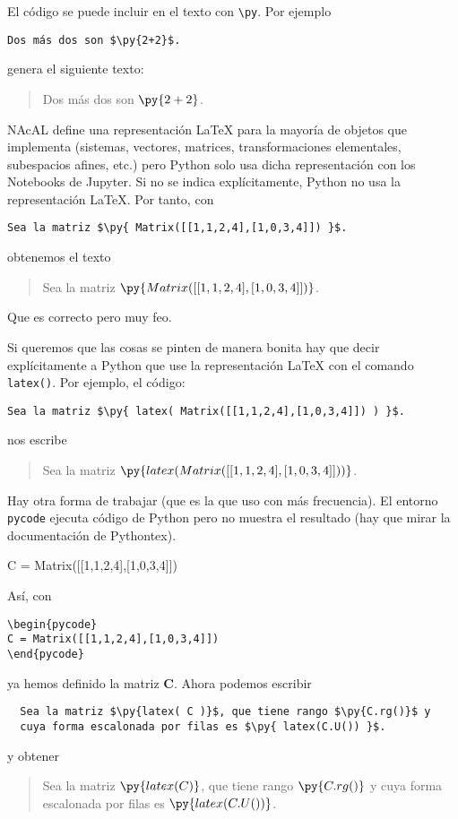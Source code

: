\documentclass[12pt,a4paper]{article} %
\begin{document}
El código se puede incluir en el texto con \verb+\py+. Por ejemplo
\begin{Verbatim}
Dos más dos son $\py{2+2}$.
\end{Verbatim}
genera el siguiente texto:
\begin{quote}
  Dos más dos son $\py{2+2}$.
\end{quote}

NAcAL define una representación \LaTeX{} para la mayoría de objetos
que implementa (sistemas, vectores, matrices, transformaciones
elementales, subespacios afines, etc.) pero Python solo usa dicha
representación con los Notebooks de Jupyter. Si no se indica
explícitamente, Python no usa la representación \LaTeX{}. Por tanto,
con
\begin{Verbatim}
Sea la matriz $\py{ Matrix([[1,1,2,4],[1,0,3,4]]) }$.
\end{Verbatim}
obtenemos el texto
\begin{quote}
  Sea la matriz $\py{ Matrix([[1,1,2,4],[1,0,3,4]]) }$.
\end{quote}
Que es correcto pero muy feo.
\medskip


Si queremos que las cosas se pinten de manera bonita hay que decir
explícitamente a Python que use la representación \LaTeX{} con el
comando \texttt{latex()}. Por ejemplo, el código:

\begin{Verbatim}
Sea la matriz $\py{ latex( Matrix([[1,1,2,4],[1,0,3,4]]) ) }$.
\end{Verbatim}
nos escribe
\begin{quote}
  Sea la matriz $\py{ latex( Matrix([[1,1,2,4],[1,0,3,4]]) ) }$.
\end{quote}
\medskip


Hay otra forma de trabajar (que es la que uso con más frecuencia). El
entorno \texttt{pycode} ejecuta código de Python pero no muestra el
resultado (hay que mirar la documentación de Pythontex).
\begin{pycode}
C = Matrix([[1,1,2,4],[1,0,3,4]])
\end{pycode}  
Así, con
\begin{Verbatim}
\begin{pycode}
C = Matrix([[1,1,2,4],[1,0,3,4]])
\end{pycode}  
\end{Verbatim}
ya hemos definido la matriz $\mathbf{C}$. Ahora podemos escribir
\begin{Verbatim}
  Sea la matriz $\py{latex( C )}$, que tiene rango $\py{C.rg()}$ y
  cuya forma escalonada por filas es $\py{ latex(C.U()) }$.
\end{Verbatim}
y obtener
\begin{quote}
  Sea la matriz $\py{latex( C )}$, que tiene rango $\py{C.rg()}$ y
  cuya forma escalonada por filas es $\py{ latex(C.U()) }$.
\end{quote}
\end{document}
